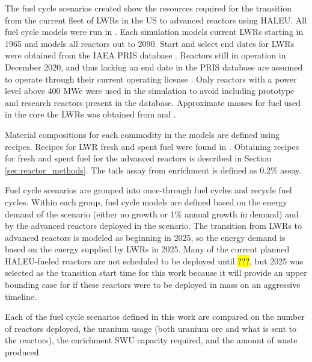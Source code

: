 The fuel cycle scenarios created show the resources required for the transition from the 
current fleet of \glspl{LWR} in the US to advanced reactors using \gls{HALEU}.
All fuel cycle models were run in \Cyclus 
\cite{huff_fundamental_2016}. Each simulation models current 
\glspl{LWR} starting in 1965 and models all reactors out to 2090. Start 
and select end dates for \glspl{LWR} were obtained from the \gls{IAEA} \gls{PRIS} database 
\cite{noauthor_power_1989}. Reactors still in operation in December 2020, and thus 
lacking an end date in the \gls{PRIS} database are assumed to operate through their 
current operating license 
\cite{noauthor_us_nodate}.
Only reactors with a power level above 400 MWe were used in the simulation 
to avoid including prototype and research reactors present in the database. 
Approximate masses for fuel used in the core the \glspl{LWR} was obtained 
from \cite{todreas_nuclear_2012} and \cite{cacuci_handbook_2010}. 

Material compositions for each commodity in the models are defined using recipes.
Recipes for \gls{LWR} fresh and spent fuel were found in \cite{jacobson_verifiable_2010}.
Obtaining recipes for fresh and spent fuel for the advanced reactors is described in 
Section \ref{sec:reactor_methods}. The tails assay from enrichment is defined as 
0.2\% assay. 

Fuel cycle scenarios are grouped into once-through fuel cycles and recycle fuel 
cycles. Within each group, fuel cycle models are defined based on the energy demand 
of the scenario (either no growth or 1\% annual growth in demand) and by the 
advanced reactors deployed in the scenario. The transition from \glspl{LWR} to 
advanced reactors is modeled as beginning in 2025, so the energy demand is based on the 
energy supplied by \glspl{LWR} in 2025. Many of the current planned \gls{HALEU}-fueled 
reactors are not scheduled to be deployed until \hl{???}, but 2025 was selected as 
the transition start time for this work because it will provide an upper 
bounding case for if these reactors were to be deployed in mass on 
an aggressive timeline. 

Each of the fuel cycle scenarios 
defined in this work are compared on the number of reactors deployed, the 
uranium usage (both uranium ore and what is sent to the reactors), the enrichment 
\gls{SWU} capacity required, and the amount of waste produced. 

